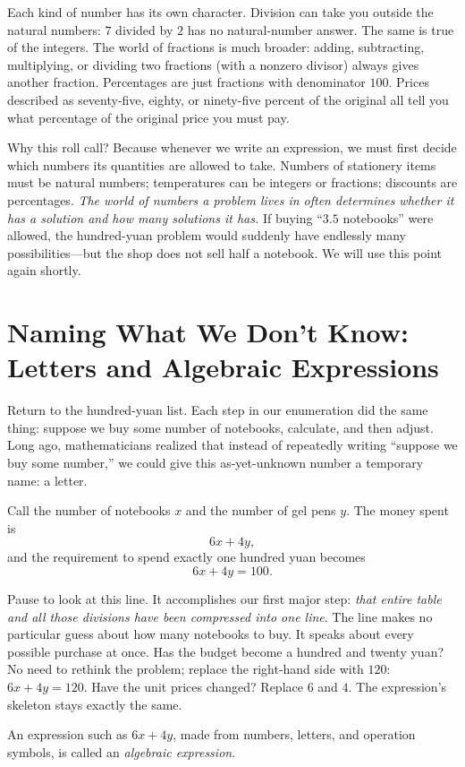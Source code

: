 Each kind of number has its own character. Division can take you outside the natural numbers: $7$ divided by $2$ has no natural-number answer. The same is true of the integers. The world of fractions is much broader: adding, subtracting, multiplying, or dividing two fractions (with a nonzero divisor) always gives another fraction. Percentages are just fractions with denominator $100$. Prices described as seventy-five, eighty, or ninety-five percent of the original all tell you what percentage of the original price you must pay.

Why this roll call? Because whenever we write an expression, we must first decide which numbers its quantities are allowed to take. Numbers of stationery items must be natural numbers; temperatures can be integers or fractions; discounts are percentages. \emph{The world of numbers a problem lives in often determines whether it has a solution and how many solutions it has.} If buying ``$3.5$ notebooks'' were allowed, the hundred-yuan problem would suddenly have endlessly many possibilities---but the shop does not sell half a notebook. We will use this point again shortly.

\section{Naming What We Don't Know: Letters and Algebraic Expressions}

Return to the hundred-yuan list. Each step in our enumeration did the same thing: suppose we buy some number of notebooks, calculate, and then adjust. Long ago, mathematicians realized that instead of repeatedly writing ``suppose we buy some number,'' we could give this as-yet-unknown number a temporary name: a letter.

Call the number of notebooks $x$ and the number of gel pens $y$. The money spent is
\[
6x+4y,
\]
and the requirement to spend exactly one hundred yuan becomes
\[
6x+4y=100.
\]

Pause to look at this line. It accomplishes our first major step: \emph{that entire table and all those divisions have been compressed into one line}. The line makes no particular guess about how many notebooks to buy. It speaks about every possible purchase at once. Has the budget become a hundred and twenty yuan? No need to rethink the problem; replace the right-hand side with $120$: $6x+4y=120$. Have the unit prices changed? Replace $6$ and $4$. The expression's skeleton stays exactly the same.

An expression such as $6x+4y$, made from numbers, letters, and operation symbols, is called an \emph{algebraic expression}.

